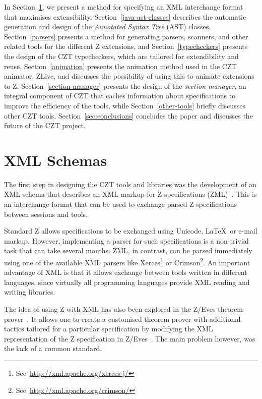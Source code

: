 \documentclass{llncs}
\begin{document}
  In Section~\ref{xml-schemas}, we present a method for specifying an
  XML interchange format that maximises extensibility.
  Section~\ref{java-ast-classes} describes the automatic generation
  and design of the \emph{Annotated Syntax Tree} (AST) classes.
  Section~\ref{parsers} presents a method for generating parsers,
  scanners, and other related tools for the different Z extensions,
  and Section~\ref{typecheckers} presents the design of the CZT
  typecheckers, which are tailored for extendibility and
  reuse. Section~\ref{animation} presents the animation method used in
  the CZT animator, ZLive, and discusses the possibility of using this
  to animate extensions to Z. Section~\ref{section-manager} presents
  the design of the {\em section manager}, an integral component of
  CZT that caches information about specifications to improve the
  efficiency of the tools, while Section~\ref{other-tools} briefly
  discusses other CZT tools. Section~\ref{sec:conclusions} concludes
  the paper and discusses the future of the CZT project.


\section{XML Schemas}
\label{xml-schemas}

  The first step in designing the CZT tools and libraries was the
  development of an XML schema that describes an XML markup for Z
  specifications (ZML)~\cite{UttEA:03}.  This is an interchange format
  that can be used to exchange parsed Z specifications between 
  sessions and tools.  

  Standard Z allows specifications to be exchanged using Unicode,
  \LaTeX\ or e-mail markup.  However, implementing a parser for such
  specifications is a non-trivial task that can take several months.
  ZML, in contrast, can be parsed
  immediately using one of the available XML parsers like
  Xerces\footnote{See~\url{http://xml.apache.org/xerces-j/}} or
  Crimson\footnote{See~\url{http://xml.apache.org/crimson/}}.
  An important advantage of XML is that it allows
  exchange between tools written in different languages, since virtually
  all programming languages provide XML reading and writing libraries.

  The idea of using Z with XML has also been explored in the
  Z/Eves theorem prover~\cite{tp.tools:zeves.ref}.  It allows one to
  create a customised theorem prover with additional tactics tailored
  for a particular specification by modifying the XML representation
  of the Z specification in Z/Eves~\cite{tp.tools:zeves.api}.
  The main problem however, was the lack of a common standard.
\end{document}
